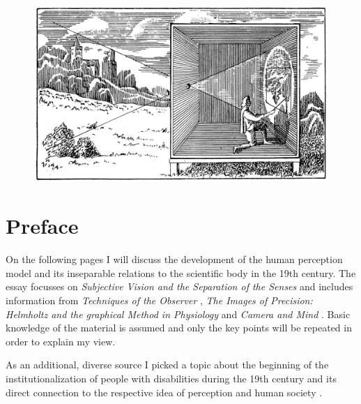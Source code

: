 \documentclass[12pt,a4paper]{article}
\begin{document}
\begin{titlepage}

\vspace{1cm}

\begin{figure}[h]
	\centering
	\includegraphics[width=\textwidth]{img/cameraobscura.jpeg}
\end{figure}

\vspace{1cm}
\center{\today}

\end{titlepage}


\newpage

\section*{Preface}

On the following pages I will discuss the development of the human perception model and its
inseparable relations to the scientific body in the 19th century. The essay focusses on
{\it{Subjective Vision and the Separation of the Senses}} \cite{crary} and includes information from
{\it{Techniques of the Observer}} \cite{crary}, {\it{The Images of Precision: Helmholtz and the
graphical Method in Physiology}} \cite{holmes} and {\it{Camera and Mind}} \cite{ellenbogen}. Basic
knowledge of the material is assumed and only the key points will be repeated in order to explain
my view.

As an additional, diverse source I picked a topic about the beginning of the institutionalization of people
with disabilities during the 19th century and its direct connection to the respective idea of
perception and human society \cite{earlymovement}.
\end{document}
